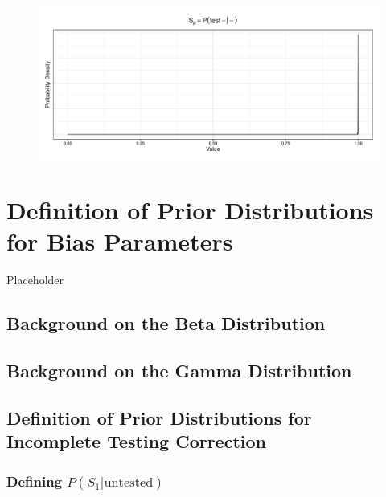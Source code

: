 \documentclass[12pt,twoside]{smiththesis}
\begin{document}
\begin{figure}

{\centering \includegraphics[width=1\linewidth]{thesis_files/figure-latex/unnamed-chunk-41-1} 

}

\caption{\label{fig:gaus}}\label{fig:unnamed-chunk-41}
\end{figure}
\hypertarget{defpriors}{%
\chapter{Definition of Prior Distributions for Bias Parameters}\label{defpriors}}

Placeholder

\hypertarget{background-on-the-beta-distribution}{%
\section{Background on the Beta Distribution}\label{background-on-the-beta-distribution}}

\hypertarget{background-on-the-gamma-distribution}{%
\section{Background on the Gamma Distribution}\label{background-on-the-gamma-distribution}}

\hypertarget{definition-of-prior-distributions-for-incomplete-testing-correction}{%
\section{Definition of Prior Distributions for Incomplete Testing Correction}\label{definition-of-prior-distributions-for-incomplete-testing-correction}}

\hypertarget{defining-ps_1textuntested}{%
\subsection{\texorpdfstring{Defining \(P(S_1|\text{untested})\)}{Defining P(S\_1\textbar\textbackslash text\{untested\})}}\label{defining-ps_1textuntested}}
\end{document}
